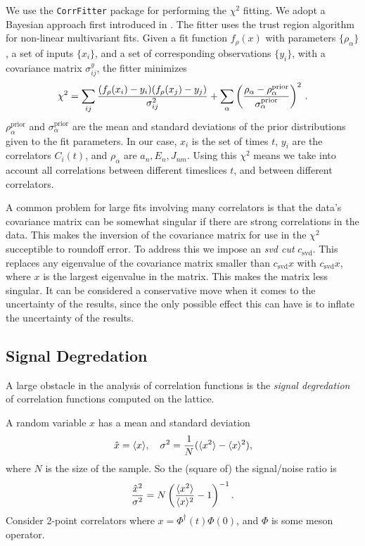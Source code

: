 We use the \texttt{CorrFitter} package \cite{CorrFitter} for performing the $\chi^2$ fitting. We adopt a Bayesian approach first introduced in \cite{Lepage:2001ym}. The fitter uses the trust region algorithm for non-linear multivariant fits. Given a fit function $f_{\rho}(x)$ with parameters $\{\rho_{\alpha}\}$, a set of inputs $\{x_i\}$, and a set of corresponding observations $\{y_i\}$, with a covariance matrix $\sigma^y_{ij}$, the fitter minimizes
\begin{align}
  \chi^2 = \sum_{ij} {( f_{\rho}(x_i) - y_i )( f_{\rho}(x_j) - y_j )\over \sigma_{ij}^{2}} + \sum_{\alpha}\left({\rho_{\alpha}-\rho^{\text{prior}}_{\alpha}\over\sigma_{\alpha}^{\text{prior}}}\right)^2\,.
\end{align}
$\rho_{\alpha}^{\text{prior}}$ and $\sigma_{\alpha}^{\text{prior}}$ are the mean and standard deviations of the prior distributions given to the fit parameters. In our case, $x_i$ is the set of times $t$, $y_i$ are the correlators $C_i(t)$, and $\rho_{\alpha}$ are $a_n,E_n,J_{nm}$. Using this $\chi^2$ means we take into account all correlations between different timeslices $t$, and between different correlators.

A common problem for large fits involving many correlators is that the data’s covariance  matrix can be somewhat singular if there are strong correlations in the data. This makes the inversion of the covariance matrix for use in the $\chi^2$ succeptible to roundoff error. To address this we impose an {\it{svd cut}} $c_{\text{svd}}$. This replaces any eigenvalue of the covariance matrix smaller than $c_{\text{svd}} x$ with $c_{\text{svd}}x$, where $x$ is the largest eigenvalue in the matrix. This makes the matrix less singular. It can be considered a conservative move when it comes to the uncertainty of the results, since the only possible effect this can have is to inflate the uncertainty of the results.

\subsection{Signal Degredation}
\label{sec:signaldegredation}

A large obstacle in the analysis of correlation functions is the \textit{signal degredation} of correlation functions computed on the lattice.

A random variable $x$ has a mean and standard deviation
\begin{align}
  \hat{x} = \langle x \rangle,\quad
  \sigma^2 = {1\over N} ( \langle x^2 \rangle - \langle x \rangle^2 ),
\end{align}
where $N$ is the size of the sample. So the (square of) the signal/noise ratio is
\begin{align}
  {\hat{x}^2\over \sigma^2} = N \left( {\langle x^2 \rangle \over \langle x \rangle^2} - 1 \right) ^{-1}.
  \label{eq:signal-noise}
\end{align}
Consider 2-point correlators where $x = \Phi^{\dagger}(t) \Phi(0)$, and $\Phi$ is some meson operator.

